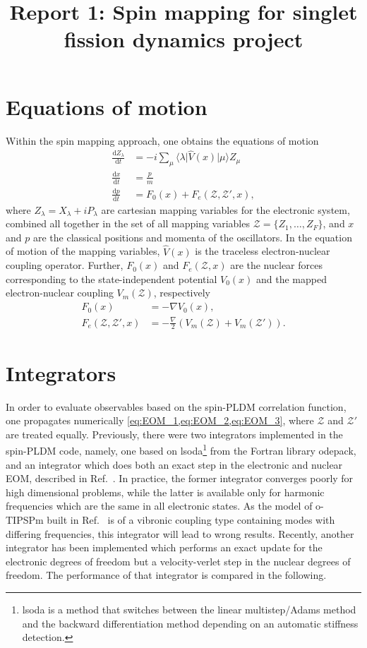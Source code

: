 \documentclass{article}
\newcommand{\dif}{\mathrm{d}}
\begin{document}
\title{Report 1: Spin mapping for singlet fission dynamics project}
\maketitle
\section{Equations of motion}
Within the spin mapping approach, one obtains the equations of motion  
\begin{align}
	\frac{\dif Z_\lambda}{\dif t} &= -i \sum_\mu \langle \lambda \vert \hat{V}(x)\vert \mu\rangle Z_\mu\label{eq:EOM_1}\\
	\frac{\dif x}{\dif t} &= \frac{p}{m}\label{eq:EOM_2}\\
	\frac{\dif p}{\dif t} &=F_0(x) +F_e(\mathcal{Z},\mathcal{Z}',x),\label{eq:EOM_3}
\end{align}
where $Z_\lambda= X_\lambda+ iP_\lambda$ are cartesian mapping variables for the electronic system, combined all together in the set of all mapping variables $\mathcal{Z}=\{Z_1,\dots,Z_F\}$, and $x$ and $p$ are the classical positions and momenta of the oscillators. In the equation of motion of the mapping variables, $\hat{V}(x)$ is the traceless electron-nuclear coupling operator. 
Further, $F_0(x)$ and $F_e(\mathcal{Z},x)$ are the nuclear forces corresponding to the state-independent potential $V_0(x)$ and the mapped electron-nuclear coupling $V_m(\mathcal{Z})$, respectively
\begin{align*}
	F_0(x) &= -\nabla V_0(x),\\
	F_e(\mathcal{Z},\mathcal{Z}',x) &= -\frac{\nabla}{2}( V_m(\mathcal{Z}) + V_m(\mathcal{Z}')).
\end{align*} 
\section{Integrators}
In order to evaluate observables based on the spin-PLDM correlation function, one propagates numerically \cref{eq:EOM_1,eq:EOM_2,eq:EOM_3}, where $\mathcal{Z}$ and $\mathcal{Z}'$ are treated equally.
Previously, there were two integrators implemented in the spin-PLDM code, namely, one based on lsoda\footnote{lsoda is a method that switches between the linear multistep/Adams method and the backward differentiation method depending on an automatic stiffness detection.} from the Fortran library odepack, and an integrator which does both an exact step in the electronic and nuclear EOM, described in Ref.~\cite{richardson2017analysis}. In practice, the former integrator converges poorly for high dimensional problems, while the latter is available only for harmonic frequencies which are the same in all electronic states. As the model of o-TIPSPm built in Ref.~\cite{reddy2018intramolecular} is of a vibronic coupling type containing modes with differing frequencies, this integrator will lead to wrong results.
Recently, another integrator has been implemented which performs an exact update for the electronic degrees of freedom but a velocity-verlet step in the nuclear degrees of freedom. The performance of that integrator is compared in the following. 
\end{document}
